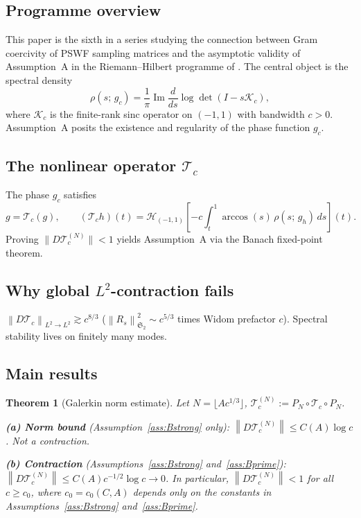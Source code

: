 \documentclass[12pt,a4paper]{article}
\newtheorem{theorem}{Theorem}[section]
\DeclareMathOperator{\Im}{Im}
\newcommand{\Tc}{\mathcal{T}_c}
\newcommand{\Kc}{\mathcal{K}_c}
\newcommand{\Hil}{\mathcal{H}_{(-1,1)}}
\newcommand{\norm}[1]{\left\|#1\right\|}
\begin{document}
\subsection{Programme overview}

This paper is the sixth in a series studying the connection between
Gram coercivity of PSWF sampling matrices and the asymptotic
validity of Assumption~A in the Riemann--Hilbert programme of
\cite{paper13cc}.
The central object is the spectral density
\[
  \rho(s;\,g_c)
  =\frac{1}{\pi}\Im\frac{d}{ds}\log\det(I-s\Kc),
\]
where $\Kc$ is the finite-rank sinc operator on $(-1,1)$ with
bandwidth $c>0$.
Assumption~A posits the existence and regularity of the
phase function $g_c$.

\subsection{The nonlinear operator $\mathcal{T}_c$}

The phase $g_c$ satisfies
\begin{equation}\label{eq:fixedpoint}
  g=\Tc(g),\qquad
  (\Tc h)(t)
  =\Hil\!\left[-c\int_t^1\arccos(s)\,\rho(s;\,g_h)\,ds\right](t).
\end{equation}
Proving $\|D\Tc^{(N)}\|<1$ yields Assumption~A via the Banach
fixed-point theorem.

\subsection{Why global $L^2$-contraction fails}

$\norm{D\Tc}_{L^2\to L^2}\gtrsim c^{8/3}$
($\norm{R_s}_{\mathfrak{S}_2}^2\sim c^{5/3}$ times Widom prefactor $c$).
Spectral stability lives on finitely many modes.

\subsection{Main results}

\begin{theorem}[Galerkin norm estimate]\label{thm:main}
Let $N=\lfloor Ac^{1/3}\rfloor$,
$\mathcal{T}_c^{(N)}:=P_N\circ\Tc\circ P_N$.

\medskip\noindent\textbf{(a) Norm bound}
(Assumption~\ref{ass:Bstrong} only):
$\norm{D\mathcal{T}_c^{(N)}}\leq C(A)\log c$.
Not a contraction.

\medskip\noindent\textbf{(b) Contraction}
(Assumptions~\ref{ass:Bstrong} and~\ref{ass:Bprime}):
$\norm{D\mathcal{T}_c^{(N)}}\leq C(A)c^{-1/2}\log c\to 0$.
In particular, $\norm{D\mathcal{T}_c^{(N)}}<1$ for all
$c\geq c_0$, where $c_0=c_0(C,A)$ depends only on the
constants in Assumptions~\ref{ass:Bstrong} and~\ref{ass:Bprime}.
\end{theorem}
\end{document}
